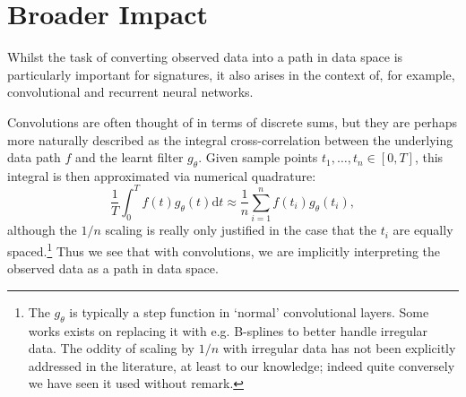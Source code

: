 \documentclass{article}
\begin{document}




\section*{Broader Impact}

Whilst the task of converting observed data into a path in data space is particularly important for signatures, it also arises in the context of, for example, convolutional and recurrent neural networks.

Convolutions are often thought of in terms of discrete sums, but they are perhaps more naturally described as the integral cross-correlation between the underlying data path $f$ and the learnt filter $g_\theta$. Given sample points $t_1, \ldots, t_n \in [0, T]$, this integral is then approximated via numerical quadrature:
\begin{equation*}
    \frac{1}{T}\int_0^T f(t) g_\theta(t) \mathrm{d}t \approx \frac{1}{n}\sum_{i = 1}^n f(t_i) g_\theta(t_i),
\end{equation*}
although the $1/n$ scaling is really only justified in the case that the $t_i$ are equally spaced.\footnote{The $g_\theta$ is typically a step function in `normal' convolutional layers. Some works exists on replacing it with e.g. B-splines \cite{fey2018splinecnn} to better handle irregular data. The oddity of scaling by $1/n$ with irregular data has not been explicitly addressed in the literature, at least to our knowledge; indeed quite conversely we have seen it used without remark.} Thus we see that with convolutions, we are implicitly interpreting the observed data as a path in data space.
\end{document}
